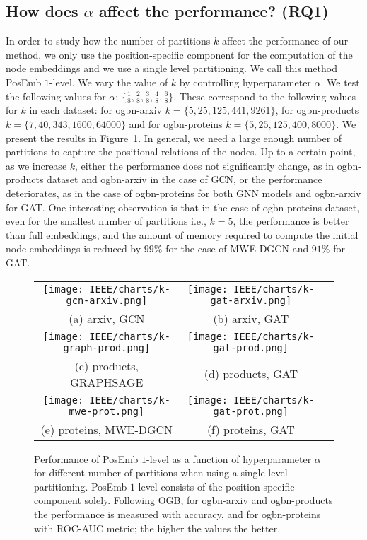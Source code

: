 \documentclass[conference]{IEEEtran}
\begin{document}
\subsection{How does $\alpha$ affect the performance? (RQ1)}
In order to study how the number of partitions $k$ affect the performance of our method, we only use the position-specific component for the computation of the node embeddings and we use a single level partitioning. We call this method PosEmb $1$-level.
We vary the value of $k$ by controlling hyperparameter $\alpha$. We test the following values for $\alpha$: $\{\frac{1}{8}, \frac{2}{8}, \frac{3}{8}, \frac{4}{8}, \frac{6}{8}\}$. These correspond to the following values for $k$ in each dataset: for ogbn-arxiv $k = \{5,25,125,441,9261\}$, for ogbn-products $k=\{7,40,343,1600,64000\}$ and for ogbn-proteins $k=\{5,25,125,400,8000\}$. We present the results in Figure~\ref{fig:diff_k}. In general, we need a large enough number of partitions to capture the positional relations of the nodes. Up to a certain point, as we increase $k$, either the performance does not significantly change, as in ogbn-products dataset and ogbn-arxiv in the case of GCN, or the performance deteriorates, as in the case of ogbn-proteins for both GNN models and ogbn-arxiv for GAT. One interesting observation is that in the case of ogbn-proteins dataset, even for the smallest number of partitions i.e., $k=5$, the performance is better than full embeddings, and the amount of memory required to compute the initial node embeddings is reduced by $99\%$ for the case of MWE-DGCN and $91\%$ for GAT.
% 
\begin{figure}[!t]
    \centering
    \setlength{\tabcolsep}{-0.65em}
    \begin{tabular}{ccc}
     \texttt{[image: IEEE/charts/k-gcn-arxiv.png]} &
     \texttt{[image: IEEE/charts/k-gat-arxiv.png]} \\
     (a) arxiv, GCN & (b) arxiv, GAT \\
     \texttt{[image: IEEE/charts/k-graph-prod.png]} &
     \texttt{[image: IEEE/charts/k-gat-prod.png]} \\
     (c) products, GRAPHSAGE & (d) products, GAT \\
     \texttt{[image: IEEE/charts/k-mwe-prot.png]} &
     \texttt{[image: IEEE/charts/k-gat-prot.png]} \\
     (e) proteins, MWE-DGCN  & (f) proteins, GAT  \\
    \end{tabular}
    \caption{Performance of PosEmb $1$-level as a function of hyperparameter $\alpha$ for different number of partitions when using a single level partitioning. PosEmb $1$-level consists of the position-specific component solely. Following OGB, for ogbn-arxiv and ogbn-products the performance is measured with accuracy, and for ogbn-proteins with ROC-AUC metric; the higher the values the better.}
    \label{fig:diff_k}
\end{figure}
\end{document}
